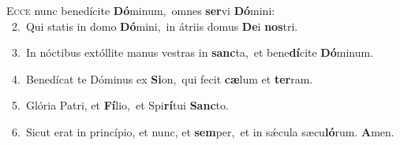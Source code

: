 \lettrine{\initial\textcolor{\initialcolor}{E}}{cce} nunc benedícite \textbf{Dó}\-minum,~\star omnes \textbf{ser}\-vi \textbf{Dó}\-mini:\\
{\numbfont\textcolor{\numbcolor}{~2.}}~Qui statis in domo \textbf{Dó}\-mini,~\star in átriis domus \textbf{De}\-i \textbf{nos}\-tri.\par
{\numbfont\textcolor{\numbcolor}{~3.}}~In nóctibus extóllite manus vestras in \textbf{sanc}\-ta,~\star et bene\-\textbf{dí}\-cite \textbf{Dó}\-minum.\par
{\numbfont\textcolor{\numbcolor}{~4.}}~Benedícat te Dóminus ex \textbf{Si}\-on,~\star qui fecit \textbf{cæ}\-lum et \textbf{ter}\-ram.\par
{\numbfont\textcolor{\numbcolor}{~5.}}~Glória Patri, et \textbf{Fí}\-lio,~\star et Spi\-\textbf{rí}\-tui \textbf{Sanc}\-to.\par
{\numbfont\textcolor{\numbcolor}{~6.}}~Sicut erat in princípio, et nunc, et \textbf{sem}\-per,~\star et in sǽcula sæcu\-\textbf{ló}\-rum. \textbf{A}\-men.\par
